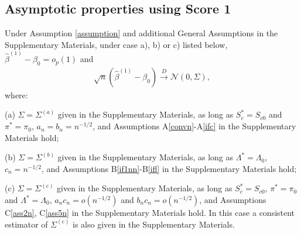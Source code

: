 \documentclass[11pt]{article}
\newcommand{\eqnn}{\begin{eqnarray*}}
\newcommand{\een}{\end{eqnarray*}}
\begin{document}
\subsection{Asymptotic properties using Score 1}



Under Assumption \ref{assumption} and additional General Assumptions 
in the Supplementary Materials,  
under case a), b) or c) listed below, 
$\hat \beta^{(1)}-\beta_{0}=o_p(1)$ and
\eqnn \sqrt{n}\left(\hat \beta^{(1)} - \beta_{0}\right)\overset{D}{\rightarrow}\mathcal{N}(0,\Sigma), 
\een
where:

(a)  
$\Sigma  = \Sigma^{(a)}$ given in the Supplementary Materials,  as long as 
$S^{*}_c =S_{c0} $ and $\pi^{*} =\pi_0 $, 
 $a_n=b_n=n^{-1/2}$,
and Assumptions A\ref{convn}-A\ref{ifc} in the Supplementary Materials hold;

(b) $\Sigma  = \Sigma^{(b)}$ given in the Supplementary Materials,  as long as 
$\Lambda^{*} =\Lambda_0 $, 
 $c_n=n^{-1/2}$,
and Assumptions B\ref{if1nn}-B\ref{ifl} in the Supplementary Materials hold; 

(c) $\Sigma  = \Sigma^{(c)}$ given in the Supplementary Materials,  as long as 
$S^{*}_c =S_{c0} $, $\pi^{*} =\pi_0 $ and 
$\Lambda^{*} =\Lambda_0 $, $a_nc_n=o(n^{-1/2})$ and $b_nc_n=o(n^{-1/2})$, and Assumptions C\ref{ass2n}, C\ref{ass5n} in the Supplementary Materials hold.
In this case a consistent estimator of $\Sigma^{(c)}$ is also given in the Supplementary Materials. 
\end{document}

